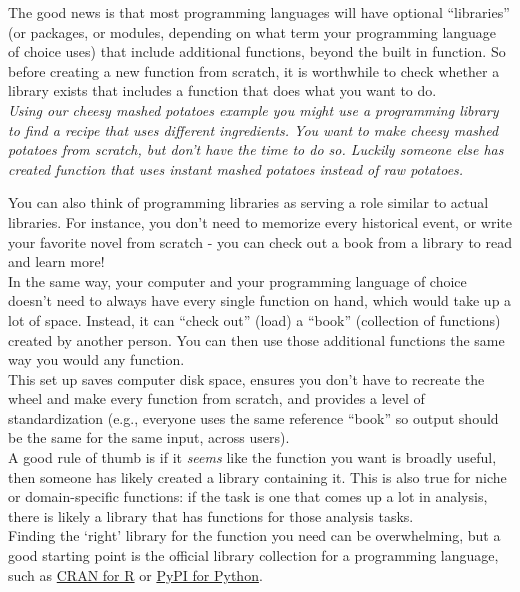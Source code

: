 \documentclass[
]{book}
\begin{document}
The good news is that most programming languages will have optional ``libraries'' (or packages, or modules, depending on what term your programming language of choice uses) that include additional functions, beyond the built in function. So before creating a new function from scratch, it is worthwhile to check whether a library exists that includes a function that does what you want to do.\\

\emph{Using our cheesy mashed potatoes example you might use a programming library to find a recipe that uses different ingredients. You want to make cheesy mashed potatoes from scratch, but don't have the time to do so. Luckily someone else has created function that uses instant mashed potatoes instead of raw potatoes.}

You can also think of programming libraries as serving a role similar to actual libraries. For instance, you don't need to memorize every historical event, or write your favorite novel from scratch - you can check out a book from a library to read and learn more!\\

In the same way, your computer and your programming language of choice doesn't need to always have every single function on hand, which would take up a lot of space. Instead, it can ``check out'' (load) a ``book'' (collection of functions) created by another person. You can then use those additional functions the same way you would any function.\\

This set up saves computer disk space, ensures you don't have to recreate the wheel and make every function from scratch, and provides a level of standardization (e.g., everyone uses the same reference ``book'' so output should be the same for the same input, across users).\\

A good rule of thumb is if it \emph{seems} like the function you want is broadly useful, then someone has likely created a library containing it. This is also true for niche or domain-specific functions: if the task is one that comes up a lot in analysis, there is likely a library that has functions for those analysis tasks.\\

Finding the `right' library for the function you need can be overwhelming, but a good starting point is the official library collection for a programming language, such as \href{https://cran.r-project.org/web/views/}{CRAN for R} or \href{https://pypi.org/}{PyPI for Python}.
\end{document}
